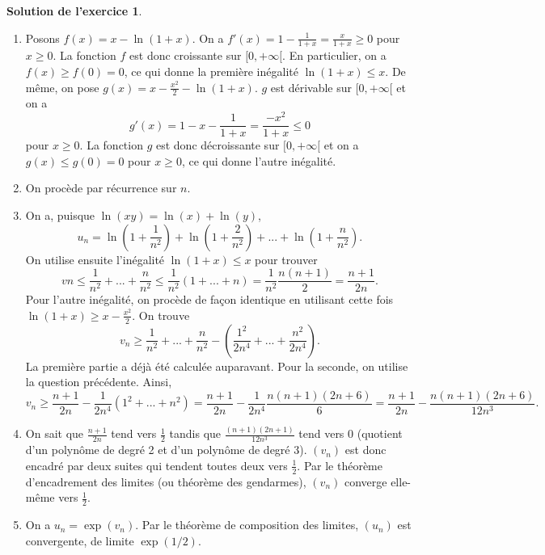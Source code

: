 \documentclass[a4paper, 11pt,openany]{article}%
\theoremstyle{plain}
\theoremstyle{definition}
\newtheorem{sol}{Solution de l'exercice}
\theoremstyle{remark}
\begin{document}
\begin{sol}
\begin{enumerate}
\item Posons $f(x)=x-\ln(1+x)$. On a $f'(x)=1-\frac{1}{1+x}=\frac{x}{1+x} \geqslant 0$ pour $x \geqslant 0$. La fonction $f$ est donc croissante sur $[0,+\infty[$. En particulier, on a $f(x) \geqslant f(0)=0$, ce qui donne la première inégalité $\ln(1+x) \leqslant x$. De même, on pose $g(x)=x- \frac{x^2}{2}-\ln(1+x)$. $g$ est dérivable sur $[0,+\infty[$ et on a \[g'(x)=1-x- \frac{1}{1+x} = \frac{-x^2}{1+x} \leqslant 0\]
pour $x \geqslant 0$. La fonction $g$ est donc décroissante sur $[0,+ \infty[$ et on a $g(x) \leqslant g(0)=0$ pour $x \geqslant 0$, ce qui donne l'autre inégalité.
\item On procède par récurrence sur $n$.
\item On a, puisque $\ln(xy)=\ln(x)+\ln(y)$,
\[ u_n =\ln \left(1+\frac{1}{n^2} \right) + \ln \left( 1+\frac{2}{n^2} \right)+ ... + \ln \left(1+\frac{n}{n^2} \right).\]
On utilise ensuite l'inégalité $\ln(1+x)\leqslant x$ pour trouver 
\[ vn \leqslant \frac{1}{n^2} + ... + \frac{n}{n^2} \leqslant \frac{1}{n^2}(1+...+n) =  \frac{1}{n^2} \frac{n(n+1)}{2} = \frac{n+1}{2n}.\]
Pour l'autre inégalité, on procède de façon identique en utilisant cette fois $\ln(1+x) \geqslant x - \frac{x^2}{2}$. On trouve 
\[ v_n \geqslant  \frac{1}{n^2} + ... + \frac{n}{n^2} - \left( \frac{1^2}{2n^4} + ... + \frac{n^2}{2n^4} \right).\]
La première partie a déjà été calculée auparavant. Pour la seconde, on utilise la question précédente. Ainsi,
\[ v_n \geqslant \frac{n+1}{2n} - \frac{1}{2n^4}(1^2 + ... + n^2)= \frac{n+1}{2n} - \frac{1}{2n^4}\frac{n(n+1)(2n+6)}{6} = \frac{n+1}{2n} - \frac{n(n+1)(2n+6)}{12n^3} .\]
\item On sait que $\frac{n+1}{2n}$ tend vers $\frac{1}{2}$ tandis que $\frac{(n+1)(2n+1)}{12n^3}$ tend vers $0$ (quotient d'un polynôme de degré 2 et d'un polynôme de degré 3). $(v_n)$ est donc encadré par deux suites qui tendent toutes deux vers $\frac{1}{2}$. Par le théorème d'encadrement des limites (ou théorème des gendarmes), $(v_n)$ converge elle-même vers $\frac{1}{2}$. 
\item On a $u_n=\exp(v_n)$. Par le théorème de composition des limites, $(u_n)$ est convergente, de limite $\exp(1/2)$. 
\end{enumerate}
\end{sol}
\end{document}
